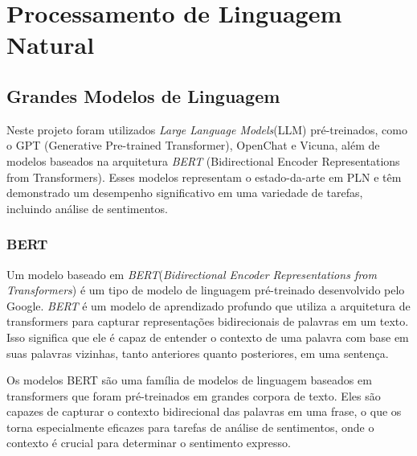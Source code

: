 \section{Processamento de Linguagem Natural}



\subsection{Grandes Modelos de Linguagem}





Neste projeto foram utilizados \emph{Large Language Models}(LLM) pré-treinados, como o GPT (Generative Pre-trained Transformer), OpenChat e Vicuna, além de modelos baseados na arquitetura \emph{BERT} (Bidirectional Encoder Representations from Transformers)\cite{hugoZanini2021mediu}. Esses modelos representam o estado-da-arte em PLN e têm demonstrado um desempenho significativo em uma variedade de tarefas, incluindo análise de sentimentos.


\subsubsection[BERT]{BERT}
\label{cap:fund_teorica:sec:modelos:subsec:bert}

Um modelo baseado em \emph{BERT}(\textit{Bidirectional Encoder Representations from Transformers}) é um tipo de modelo de linguagem pré-treinado desenvolvido pelo Google. \emph{BERT} é um modelo de aprendizado profundo que utiliza a arquitetura de transformers para capturar representações bidirecionais de palavras em um texto. Isso significa que ele é capaz de entender o contexto de uma palavra com base em suas palavras vizinhas, tanto anteriores quanto posteriores, em uma sentença.

Os modelos BERT são uma família de modelos de linguagem baseados em transformers que foram pré-treinados em grandes corpora de texto. Eles são capazes de capturar o contexto bidirecional das palavras em uma frase, o que os torna especialmente eficazes para tarefas de análise de sentimentos, onde o contexto é crucial para determinar o sentimento expresso.

